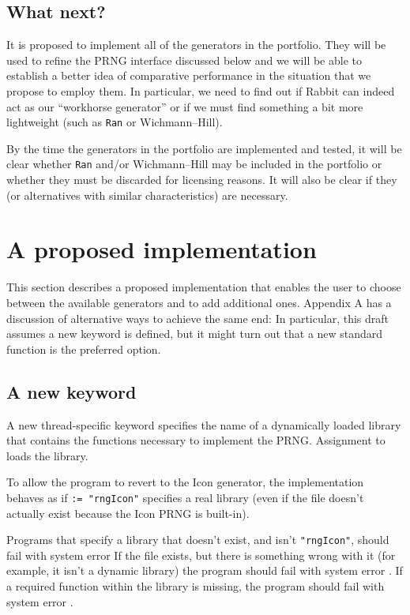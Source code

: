 \documentclass[letterpaper,12pt]{article}
\begin{document}
\subsection{What next?}
It is proposed to implement all of the generators in the portfolio.  They
will be used to refine the PRNG interface discussed below and we will be
able to establish a better idea of comparative performance in the situation
that we propose to employ them. In particular, we need to find out if
Rabbit can indeed act as our ``workhorse generator'' or if we must find
something a bit more lightweight (such as \texttt{Ran} or Wichmann--Hill).

By the time the generators in the portfolio are implemented and tested, it
will be clear whether \texttt{Ran} and/or Wichmann--Hill may be included in
the portfolio or whether they must be discarded for licensing reasons. It
will also be clear if they (or alternatives with similar characteristics)
are necessary.

\section{A proposed implementation}
This section describes a proposed implementation that enables the user to
choose between the available generators and to add additional ones.
Appendix A has a discussion of alternative ways to achieve the same end: In
particular, this draft assumes a new keyword is defined, but it might
turn out that a new standard function is the preferred option.

\subsection{A new keyword}
A new thread-specific keyword \rndlibkwd specifies the
name of a dynamically loaded library that contains the functions
necessary to implement the PRNG. Assignment to \rndlibkwd loads the library.

To allow the program to revert to the Icon generator, the implementation
behaves as if \rndlibkwd\texttt{:=~"rngIcon"} specifies a real library
(even if the file doesn't actually exist because the Icon PRNG is
built-in).

Programs that specify a library that doesn't exist, and
isn't \texttt{"rngIcon"}, should fail with system error
%
If the file exists, but there is something wrong with it (for example, it
isn't a dynamic library) the program should fail with system error
.
%
If a required function within the library is missing, the program should
fail with system error .
\end{document}
